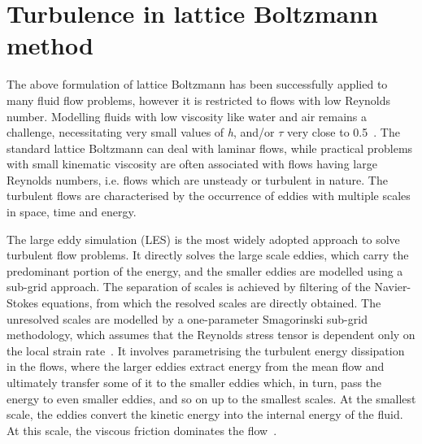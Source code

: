 
\section{Turbulence in lattice Boltzmann method}

The above formulation of lattice Boltzmann has been successfully 
applied to many fluid flow problems, however it is restricted to flows with low 
Reynolds number. Modelling fluids with low viscosity like water and air 
remains a challenge, necessitating very small values of \textit{h}, and/or 
$\tau$ very close to 0.5~\citep{He1997}. The standard lattice Boltzmann can 
deal with laminar flows, while practical problems with small kinematic 
viscosity are often associated with flows having large Reynolds numbers, i.e. 
flows which are unsteady or turbulent in nature. The turbulent flows are 
characterised by the occurrence of eddies with multiple scales in space, time 
and energy.

The large eddy simulation (LES) is the most widely adopted approach to 
solve turbulent flow problems. It directly solves the large scale eddies, which 
carry the predominant portion of the energy, and the smaller eddies are 
modelled using a sub-grid approach. The separation of scales is achieved by 
filtering of the Navier-Stokes equations, from which the resolved scales are 
directly obtained. The unresolved scales are modelled by a one-parameter 
Smagorinski sub-grid methodology, which assumes that the Reynolds stress 
tensor is dependent only on the local strain rate~\citep{Smagorinsky1963}. It 
involves parametrising the turbulent energy dissipation in the flows, where the 
larger eddies extract energy from the mean flow and ultimately transfer some of 
it to the smaller eddies which, in turn, pass the energy to even smaller 
eddies, and so on up to the smallest scales. At the smallest scale, the eddies 
convert the kinetic energy into the internal energy of the fluid. At this 
scale, the viscous friction dominates the flow~\citep{Frisch1995}.

